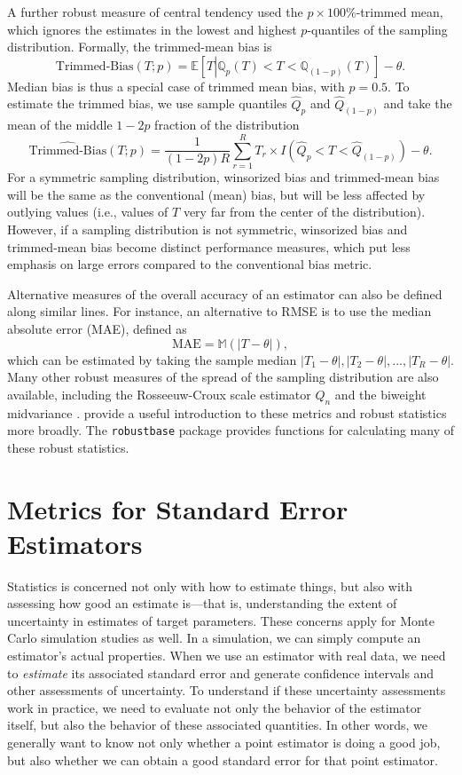\documentclass[
]{book}
\newcommand{\E}{\mathbb{E}}
\newcommand{\M}{\mathbb{M}}
\newcommand{\Q}{\mathbb{Q}}
\begin{document}
A further robust measure of central tendency used the \(p \times 100\%\)-trimmed mean, which ignores the estimates in the lowest and highest \(p\)-quantiles of the sampling distribution.
Formally, the trimmed-mean bias is
\[
\text{Trimmed-Bias}(T; p) = \E\left[ T \left| \Q_{p}(T) < T < \Q_{(1 - p)}(T) \right.\right] - \theta. 
\label{eq:trimmed-bias}
\]
Median bias is thus a special case of trimmed mean bias, with \(p = 0.5\).
To estimate the trimmed bias, we use sample quantiles \(\hat{Q}_p\) and \(\hat{Q}_{(1 - p)}\) and take the mean of the middle \(1 - 2p\) fraction of the distribution
\[
\widehat{\text{Trimmed-Bias}}(T; p) = \frac{1}{(1 - 2p)R} \sum_{r=1}^R T_r \times I\left(\hat{Q}_{p} < T < \hat{Q}_{(1 - p)}\right) - \theta. \label{eq:sample-trimmed-bias}
\]
For a symmetric sampling distribution, winsorized bias and trimmed-mean bias will be the same as the conventional (mean) bias, but will be less affected by outlying values (i.e., values of \(T\) very far from the center of the distribution).
However, if a sampling distribution is not symmetric, winsorized bias and trimmed-mean bias become distinct performance measures, which put less emphasis on large errors compared to the conventional bias metric.

Alternative measures of the overall accuracy of an estimator can also be defined along similar lines.
For instance, an alternative to RMSE is to use the median absolute error (MAE), defined as
\[
\text{MAE} = \M\left(\left|T - \theta\right|\right),
\label{eq:MAE}
\]
which can be estimated by taking the sample median \(|T_1 - \theta|, |T_2 - \theta|, ..., |T_R - \theta|\).
Many other robust measures of the spread of the sampling distribution are also available, including the Rosseeuw-Croux scale estimator \(Q_n\) \citep{Rousseeuw1993alternatives} and the biweight midvariance \citep{Wilcox2022introduction}.
\citet{Maronna2006robust} provide a useful introduction to these metrics and robust statistics more broadly.
The \texttt{robustbase} package \citep{robustbase} provides functions for calculating many of these robust statistics.

\section{Metrics for Standard Error Estimators}\label{metrics-for-standard-error-estimators}

Statistics is concerned not only with how to estimate things, but also with assessing how good an estimate is---that is, understanding the extent of uncertainty in estimates of target parameters.
These concerns apply for Monte Carlo simulation studies as well.
In a simulation, we can simply compute an estimator's actual properties.
When we use an estimator with real data, we need to \emph{estimate} its associated standard error and generate confidence intervals and other assessments of uncertainty.
To understand if these uncertainty assessments work in practice, we need to evaluate not only the behavior of the estimator itself, but also the behavior of these associated quantities.
In other words, we generally want to know not only whether a point estimator is doing a good job, but also whether we can obtain a good standard error for that point estimator.
\end{document}
